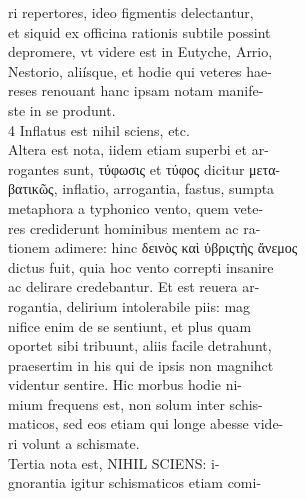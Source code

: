 \documentclass{article}
\begin{document}
\begin{pages}
                ri repertores, ideo figmentis delectantur, \\
                et siquid ex officina rationis subtile possint \\
                depromere, vt videre est in Eutyche, Arrio, \\
                Nestorio, aliísque, et hodie qui veteres hae- \\
                reses renouant hanc ipsam notam manife- \\
                ste in se produnt. \\
                4 Inflatus est nihil sciens, etc. \\
                Altera est nota, iidem etiam superbi et ar- \\
                rogantes sunt, τύφωσις et τύφος dicitur  μετα- \\
                βατικῶς, inflatio, arrogantia, fastus, sumpta \\
                metaphora a typhonico vento, quem vete- \\
                res crediderunt hominibus mentem ac ra- \\
                tionem adimere: hinc δεινὸς καὶ ὑβριςτὴς ἄνεμος \\
                dictus fuit, quia hoc vento correpti insanire \\
                ac delirare credebantur. Et est reuera ar- \\
                rogantia, delirium intolerabile piis: mag \\
                nifice enim de se sentiunt, et plus quam \\
                oportet sibi tribuunt, aliis facile detrahunt, \\
                praesertim in his qui de ipsis non magnihct \\
                videntur sentire. Hic morbus hodie ni- \\
                mium frequens est, non solum inter schis- \\
                maticos, sed eos etiam qui longe abesse vide- \\
                ri volunt a schismate. \\
                Tertia nota est, NIHIL SCIENS: i- \\
                gnorantia igitur schismaticos etiam comi- \\

\end{pages}
\end{document}
